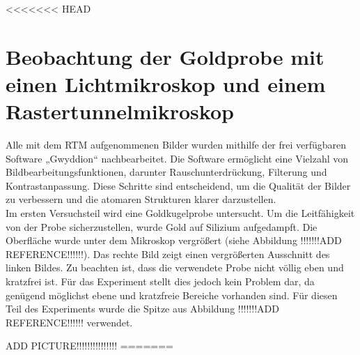 <<<<<<< HEAD
\chapter{Beobachtung der Goldprobe mit einen Lichtmikroskop und einem Rastertunnelmikroskop}
Alle mit dem RTM aufgenommenen Bilder wurden mithilfe der frei verfügbaren Software „Gwyddion“ nachbearbeitet.
Die Software ermöglicht eine Vielzahl von Bildbearbeitungsfunktionen, darunter Rauschunterdrückung, Filterung und Kontrastanpassung. Diese Schritte sind entscheidend, um die Qualität der Bilder zu verbessern und die atomaren Strukturen klarer darzustellen.\\
Im ersten Versuchsteil wird eine Goldkugelprobe untersucht. Um die Leitfähigkeit von der Probe sicherzustellen, wurde Gold auf Silizium aufgedampft. Die Oberfläche wurde unter dem Mikroskop vergrößert (siehe Abbildung !!!!!!!ADD REFERENCE!!!!!!). 
Das rechte Bild zeigt einen vergrößerten Ausschnitt des linken Bildes. Zu beachten ist, dass die verwendete Probe nicht völlig eben und kratzfrei ist. Für das Experiment stellt dies jedoch kein Problem dar, da genügend möglichst ebene und kratzfreie Bereiche vorhanden sind. Für diesen Teil des Experiments wurde die Spitze aus Abbildung !!!!!!!ADD REFERENCE!!!!!! verwendet.

 ADD PICTURE!!!!!!!!!!!!!!!
=======
